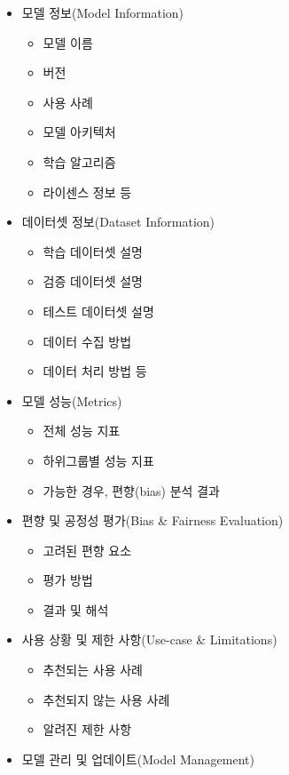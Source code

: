 \documentclass[
  letterpaper,
  chapter,a4paper,showtrims,openright,hidelinks]{oblivoir}
\providecommand{\tightlist}{%
  \setlength{\itemsep}{0pt}\setlength{\parskip}{0pt}}\usepackage{longtable,booktabs,array}
\begin{document}
\begin{itemize}
\tightlist
\item
  모델 정보(Model Information)

  \begin{itemize}
  \tightlist
  \item
    모델 이름
  \item
    버전
  \item
    사용 사례
  \item
    모델 아키텍처
  \item
    학습 알고리즘
  \item
    라이센스 정보 등
  \end{itemize}
\item
  데이터셋 정보(Dataset Information)

  \begin{itemize}
  \tightlist
  \item
    학습 데이터셋 설명
  \item
    검증 데이터셋 설명
  \item
    테스트 데이터셋 설명
  \item
    데이터 수집 방법
  \item
    데이터 처리 방법 등
  \end{itemize}
\item
  모델 성능(Metrics)

  \begin{itemize}
  \tightlist
  \item
    전체 성능 지표
  \item
    하위그룹별 성능 지표
  \item
    가능한 경우, 편향(bias) 분석 결과
  \end{itemize}
\item
  편향 및 공정성 평가(Bias \& Fairness Evaluation)

  \begin{itemize}
  \tightlist
  \item
    고려된 편향 요소
  \item
    평가 방법
  \item
    결과 및 해석
  \end{itemize}
\item
  사용 상황 및 제한 사항(Use-case \& Limitations)

  \begin{itemize}
  \tightlist
  \item
    추천되는 사용 사례
  \item
    추천되지 않는 사용 사례
  \item
    알려진 제한 사항
  \end{itemize}
\item
  모델 관리 및 업데이트(Model Management)


\end{itemize}
\end{document}
